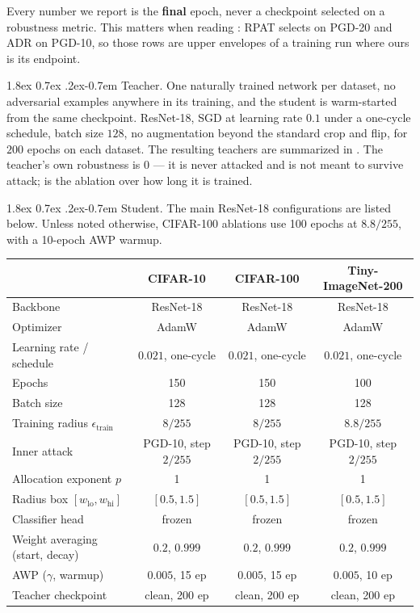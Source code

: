 \documentclass{article} %
\makeatletter
\theoremstyle{plain}
\renewcommand{\paragraph}{\@startsection{paragraph}{4}{\z@}%
  {1.8ex \@plus 0.7ex \@minus .2ex}{-0.7em}%
  {\normalfont\normalsize\bfseries}}
\makeatother
\begin{document}
Every number we report is the \textbf{final} epoch, never a checkpoint selected on a robustness
metric. This matters when reading : RPAT selects on PGD-20 and ADR on PGD-10, so
those rows are upper envelopes of a training run where ours is its endpoint.

\paragraph{Teacher.} One naturally trained network per dataset, no adversarial examples anywhere in
its training, and the student is warm-started from the same checkpoint. ResNet-18, SGD at learning
rate $0.1$ under a one-cycle schedule, batch size $128$, no augmentation beyond the standard crop and
flip, for $200$ epochs on each dataset. The resulting teachers are summarized in
. The
teacher's own robustness is $0$ --- it is never attacked and is not meant to survive attack;
 is the ablation over how long it is trained.

\paragraph{Student.} The main ResNet-18 configurations are listed below. Unless noted otherwise,
CIFAR-100 ablations use 100 epochs at $8.8/255$, with a 10-epoch AWP warmup.

\begin{center}\small
\begin{tabular}{lccc}
  \toprule
  & CIFAR-10 & CIFAR-100 & Tiny-ImageNet-200 \\
  \midrule
  Backbone                       & ResNet-18 & ResNet-18 & ResNet-18 \\
  Optimizer                      & AdamW & AdamW & AdamW \\
  Learning rate / schedule       & $0.021$, one-cycle & $0.021$, one-cycle & $0.021$, one-cycle \\
  Epochs                         & 150 & 150 & 100 \\
  Batch size                     & 128 & 128 & 128 \\
  Training radius $\epsilon_{\mathrm{train}}$ & $8/255$ & $8/255$ & $8.8/255$ \\
  Inner attack                   & PGD-10, step $2/255$ & PGD-10, step $2/255$ & PGD-10, step $2/255$ \\
  Allocation exponent $p$        & 1 & 1 & 1 \\
  Radius box $[w_{\mathrm{lo}},w_{\mathrm{hi}}]$ & $[0.5,1.5]$ & $[0.5,1.5]$ & $[0.5,1.5]$ \\
  Classifier head                & frozen & frozen & frozen \\
  Weight averaging (start, decay)& $0.2$, $0.999$ & $0.2$, $0.999$ & $0.2$, $0.999$ \\
  AWP ($\gamma$, warmup)         & $0.005$, 15 ep & $0.005$, 15 ep & $0.005$, 10 ep \\
  Teacher checkpoint             & clean, 200 ep & clean, 200 ep & clean, 200 ep \\
  \bottomrule
\end{tabular}
\end{center}
\end{document}
